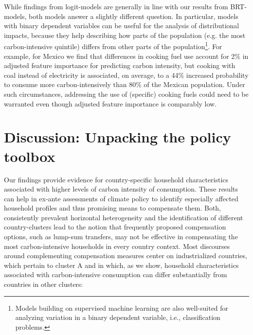 \documentclass[12pt, a4paper]{article}
\begin{document}
While findings from logit-models are generally in line with our results from BRT-models, both models answer a slightly different question. In particular, models with binary dependent variables can be useful for the analysis of distributional impacts, because they help describing how parts of the population (e.g. the most carbon-intensive quintile) differs from other parts of the population\footnote{Models building on supervised machine learning are also well-suited for analyzing variation in a binary dependent variable, i.e., classification problems.}. For example, for Mexico we find that differences in cooking fuel use account for 2\% in adjusted feature importance for predicting carbon intensity, but cooking with coal instead of electricity is associated, on average, to a 44\% increased probability to consume more carbon-intensively than 80\% of the Mexican population. Under such circumstances, addressing the use of (specific) cooking fuels could need to be warranted even though adjusted feature importance is comparably low.

\section{Discussion: Unpacking the policy toolbox} \label{sec:discussion}

Our findings provide evidence for country-specific household characteristics associated with higher levels of carbon intensity of consumption. These results can help in ex-ante assessments of climate policy to identify especially affected household profiles and thus promising means to compensate them. Both, consistently prevalent horizontal heterogeneity and the identification of different country-clusters lead to the notion that frequently proposed compensation options, such as lump-sum transfers, may not be effective in compensating the most carbon-intensive households in every country context. Most discourses around complementing compensation measures center on industrialized countries, which pertain to cluster A and in which, as we show, household characteristics associated with carbon-intensive consumption can differ substantially from countries in other clusters:
\end{document}
